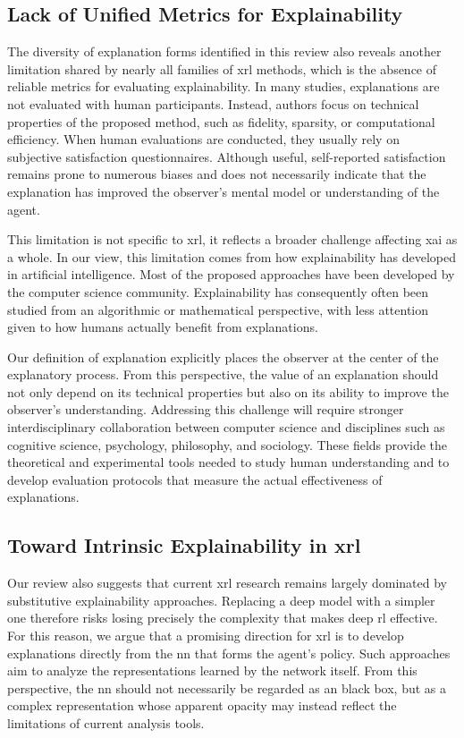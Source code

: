 \subsection{Lack of Unified Metrics for Explainability}

The diversity of explanation forms identified in this review also reveals another limitation shared by nearly all families of \gls{xrl} methods, which is the absence of reliable metrics for evaluating explainability.
In many studies, explanations are not evaluated with human participants.
Instead, authors focus on technical properties of the proposed method, such as fidelity, sparsity, or computational efficiency.
When human evaluations are conducted, they usually rely on subjective satisfaction questionnaires.
Although useful, self-reported satisfaction remains prone to numerous biases and does not necessarily indicate that the explanation has improved the observer's mental model or understanding of the agent.

This limitation is not specific to \gls{xrl}, it reflects a broader challenge affecting \gls{xai} as a whole.
In our view, this limitation comes from how explainability has developed in artificial intelligence.
Most of the proposed approaches have been developed by the computer science community.
Explainability has consequently often been studied from an algorithmic or mathematical perspective, with less attention given to how humans actually benefit from explanations.

Our definition of explanation explicitly places the observer at the center of the explanatory process.
From this perspective, the value of an explanation should not only depend on its technical properties but also on its ability to improve the observer's understanding.
Addressing this challenge will require stronger interdisciplinary collaboration between computer science and disciplines such as cognitive science, psychology, philosophy, and sociology.
These fields provide the theoretical and experimental tools needed to study human understanding and to develop evaluation protocols that measure the actual effectiveness of explanations.

\subsection{Toward Intrinsic Explainability in \gls{xrl}}

Our review also suggests that current \gls{xrl} research remains largely dominated by substitutive explainability approaches.
Replacing a deep model with a simpler one therefore risks losing precisely the complexity that makes deep \gls{rl} effective.
For this reason, we argue that a promising direction for \gls{xrl} is to develop explanations directly from the \gls{nn} that forms the agent's policy.
Such approaches aim to analyze the representations learned by the network itself.
From this perspective, the \gls{nn} should not necessarily be regarded as an black box, but as a complex representation whose apparent opacity may instead reflect the limitations of current analysis tools.

